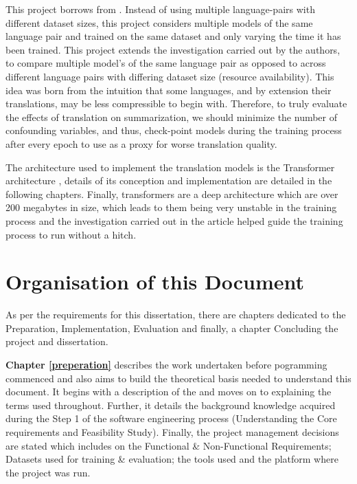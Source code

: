 \documentclass[12pt,a4paper,twoside,openright]{report}
\begin{document}
This project borrows from \cite{nguyen-daume-iii-2019-global}. Instead of using multiple language-pairs with different dataset sizes, this project considers multiple models of the same language pair and trained on the same dataset and only varying the time it has been trained. This project extends the investigation carried out by the authors, to compare multiple model's of the same language pair as opposed to across different language pairs with differing dataset size (resource availability). This idea was born from the intuition that some languages, and by extension their translations, may be less compressible to begin with. Therefore, to truly evaluate the effects of translation on summarization, we should minimize the number of confounding variables, and thus, check-point models during the training process after every epoch to use as a proxy for worse translation quality.

The architecture used to implement the translation models is the Transformer architecture \cite{transformers}, details of its conception and implementation are detailed in the following chapters. Finally, transformers are a deep architecture which are over 200 megabytes in size, which leads to them being very unstable in the training process and the investigation carried out in the article \cite{training-tips} helped guide the training process to run without a hitch.

\section{Organisation of this Document}
\label{doc-org}
As per the requirements for this dissertation, there are chapters dedicated to the Preparation, Implementation, Evaluation and finally, a chapter Concluding the project and dissertation.

\textbf{Chapter \ref{preperation}  }describes the work undertaken before pogramming commenced and also aims to build the theoretical basis needed to understand this document. It begins with a description of the  and moves on to explaining the terms used throughout. Further, it details the background knowledge acquired during the Step 1 of the software engineering process (Understanding the Core requirements and Feasibility Study). Finally, the project management decisions are stated which includes on the Functional \& Non-Functional Requirements; Datasets used for training \& evaluation; the tools used and the platform where the project was run.
\end{document}
